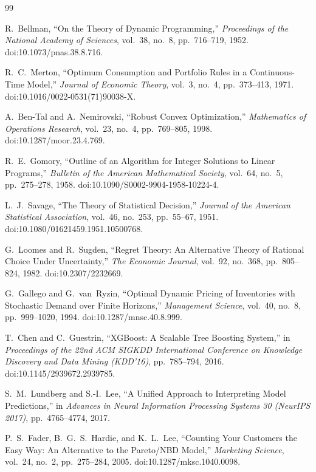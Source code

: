 \documentclass[12pt]{article}
\numberwithin{figure}{section}
\numberwithin{table}{section}
\begin{document}
	\printbibliography
	\begin{thebibliography}{99}
		
		R.~Bellman,
		``On the Theory of Dynamic Programming,''
		\emph{Proceedings of the National Academy of Sciences},
		vol.~38, no.~8, pp.~716--719, 1952.
		doi:10.1073/pnas.38.8.716.
		
		R.~C.~Merton,
		``Optimum Consumption and Portfolio Rules in a Continuous-Time Model,''
		\emph{Journal of Economic Theory},
		vol.~3, no.~4, pp.~373--413, 1971.
		doi:10.1016/0022-0531(71)90038-X.
		
		A.~Ben-Tal and A.~Nemirovski,
		``Robust Convex Optimization,''
		\emph{Mathematics of Operations Research},
		vol.~23, no.~4, pp.~769--805, 1998.
		doi:10.1287/moor.23.4.769.
		
		R.~E.~Gomory,
		``Outline of an Algorithm for Integer Solutions to Linear Programs,''
		\emph{Bulletin of the American Mathematical Society},
		vol.~64, no.~5, pp.~275--278, 1958.
		doi:10.1090/S0002-9904-1958-10224-4.
		
		L.~J.~Savage,
		``The Theory of Statistical Decision,''
		\emph{Journal of the American Statistical Association},
		vol.~46, no.~253, pp.~55--67, 1951.
		doi:10.1080/01621459.1951.10500768.
		
		G.~Loomes and R.~Sugden,
		``Regret Theory: An Alternative Theory of Rational Choice Under Uncertainty,''
		\emph{The Economic Journal},
		vol.~92, no.~368, pp.~805--824, 1982.
		doi:10.2307/2232669.
		
		G.~Gallego and G.~van~Ryzin,
		``Optimal Dynamic Pricing of Inventories with Stochastic Demand over Finite Horizons,''
		\emph{Management Science},
		vol.~40, no.~8, pp.~999--1020, 1994.
		doi:10.1287/mnsc.40.8.999.
		
		T.~Chen and C.~Guestrin,
		``XGBoost: A Scalable Tree Boosting System,''
		in \emph{Proceedings of the 22nd ACM SIGKDD International Conference on Knowledge Discovery and Data Mining (KDD'16)},
		pp.~785--794, 2016.
		doi:10.1145/2939672.2939785.
		
		S.~M.~Lundberg and S.-I.~Lee,
		``A Unified Approach to Interpreting Model Predictions,''
		in \emph{Advances in Neural Information Processing Systems 30 (NeurIPS 2017)},
		pp.~4765--4774, 2017.
		
		P.~S.~Fader, B.~G.~S.~Hardie, and K.~L.~Lee,
		``Counting Your Customers the Easy Way: An Alternative to the Pareto/NBD Model,''
		\emph{Marketing Science},
		vol.~24, no.~2, pp.~275--284, 2005.
		doi:10.1287/mksc.1040.0098.
		
	\end{thebibliography}
	
\end{document}
